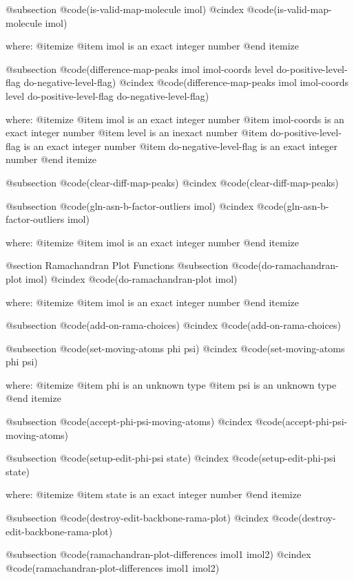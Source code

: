 @subsection @code{(is-valid-map-molecule imol)}
@cindex @code{(is-valid-map-molecule imol)}
 
where: 
 @itemize 
     @item imol is an exact integer number
 @end itemize


@subsection @code{(difference-map-peaks imol imol-coords level do-positive-level-flag do-negative-level-flag)}
@cindex @code{(difference-map-peaks imol imol-coords level do-positive-level-flag do-negative-level-flag)}
 
where: 
 @itemize 
     @item imol is an exact integer number
     @item imol-coords is an exact integer number
     @item level is an inexact number
     @item do-positive-level-flag is an exact integer number
     @item do-negative-level-flag is an exact integer number
 @end itemize


@subsection @code{(clear-diff-map-peaks)}
@cindex @code{(clear-diff-map-peaks)}
 
@subsection @code{(gln-asn-b-factor-outliers imol)}
@cindex @code{(gln-asn-b-factor-outliers imol)}
 
where: 
 @itemize 
     @item imol is an exact integer number
 @end itemize



@section Ramachandran Plot Functions 
@subsection @code{(do-ramachandran-plot imol)}
@cindex @code{(do-ramachandran-plot imol)}
 
where: 
 @itemize 
     @item imol is an exact integer number
 @end itemize


@subsection @code{(add-on-rama-choices)}
@cindex @code{(add-on-rama-choices)}
 
@subsection @code{(set-moving-atoms phi psi)}
@cindex @code{(set-moving-atoms phi psi)}
 
where: 
 @itemize 
     @item phi is an unknown type
     @item psi is an unknown type
 @end itemize


@subsection @code{(accept-phi-psi-moving-atoms)}
@cindex @code{(accept-phi-psi-moving-atoms)}
 
@subsection @code{(setup-edit-phi-psi state)}
@cindex @code{(setup-edit-phi-psi state)}
 
where: 
 @itemize 
     @item state is an exact integer number
 @end itemize


@subsection @code{(destroy-edit-backbone-rama-plot)}
@cindex @code{(destroy-edit-backbone-rama-plot)}
 
@subsection @code{(ramachandran-plot-differences imol1 imol2)}
@cindex @code{(ramachandran-plot-differences imol1 imol2)}
 
